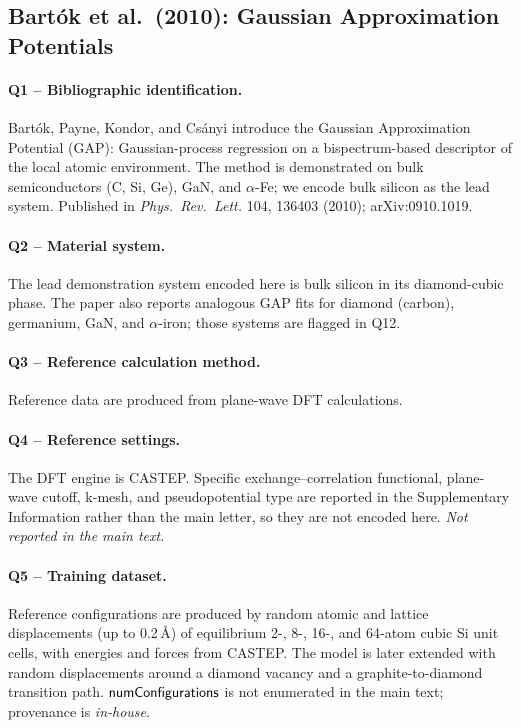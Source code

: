 \subsection{Bart\'ok et al.\ (2010): Gaussian Approximation Potentials}
\label{sec:appendix-example-bartok2010}

\paragraph{Q1 -- Bibliographic identification.}
Bart\'ok, Payne, Kondor, and Cs\'anyi introduce the Gaussian
Approximation Potential (GAP): Gaussian-process regression on a
bispectrum-based descriptor of the local atomic environment.
The method is demonstrated on bulk semiconductors (C, Si, Ge), GaN,
and $\alpha$-Fe; we encode bulk silicon as the lead system.
Published in \emph{Phys.\ Rev.\ Lett.} 104, 136403 (2010);
arXiv:0910.1019.


\paragraph{Q2 -- Material system.}
The lead demonstration system encoded here is bulk silicon in its
diamond-cubic phase. The paper also reports analogous GAP fits for
diamond (carbon), germanium, GaN, and $\alpha$-iron; those systems
are flagged in Q12.


\paragraph{Q3 -- Reference calculation method.}
Reference data are produced from plane-wave DFT calculations.


\paragraph{Q4 -- Reference settings.}
The DFT engine is CASTEP. Specific exchange--correlation functional,
plane-wave cutoff, k-mesh, and pseudopotential type are reported
in the Supplementary Information rather than the main letter, so
they are not encoded here. \emph{Not reported in the main text.}


\paragraph{Q5 -- Training dataset.}
Reference configurations are produced by random atomic and lattice
displacements (up to 0.2\,\AA) of equilibrium 2-, 8-, 16-, and
64-atom cubic Si unit cells, with energies and forces from CASTEP.
The model is later extended with random displacements around a
diamond vacancy and a graphite-to-diamond transition path.
$\mathsf{numConfigurations}$ is not enumerated in the main text;
provenance is \emph{in-house}.


